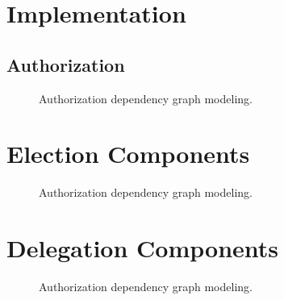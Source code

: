 \section{Implementation}

\subsection{Authorization}

\begin{figure}[H]
    \centering
    \caption{Authorization dependency graph modeling.}%
\end{figure}









\section{Election Components}

\begin{figure}[H]
    \centering
    \caption{Authorization dependency graph modeling.}%
\end{figure}

\section{Delegation Components}

\begin{figure}[H]
    \centering
    \caption{Authorization dependency graph modeling.}%
\end{figure}

